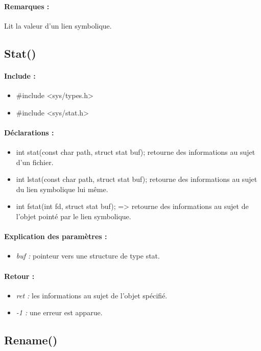 \documentclass{article}[12pt]
\begin{document}
\paragraph{Remarques : }
Lit la valeur d'un lien symbolique.
\subsection{Stat()}
\paragraph{Include : }
\begin{itemize}
	\item \#include <sys/types.h>
	\item \#include <sys/stat.h>
\end{itemize}
\paragraph{Déclarations : }
\begin{itemize}
	\item int stat(const char \* path, struct stat \* buf); retourne des informations au sujet d'un fichier.
	\item int lstat(const char \* path, struct stat \* buf); retourne des informations au sujet du lien symbolique lui même.
	\item int fstat(int fd, struct stat \* buf); => retourne des informations au sujet de l'objet pointé par le lien symbolique. 
\end{itemize}
\paragraph{Explication des paramètres : }
\begin{itemize}
	\item \emph{buf : } pointeur vers une structure de type stat.
\end{itemize}
\paragraph{Retour : }
\begin{itemize}
	\item \emph{ret : } les informations au sujet de l'objet spécifié. 
	\item \emph{-1 : } une erreur est apparue.
\end{itemize}
\subsection{Rename()}
\end{document}
